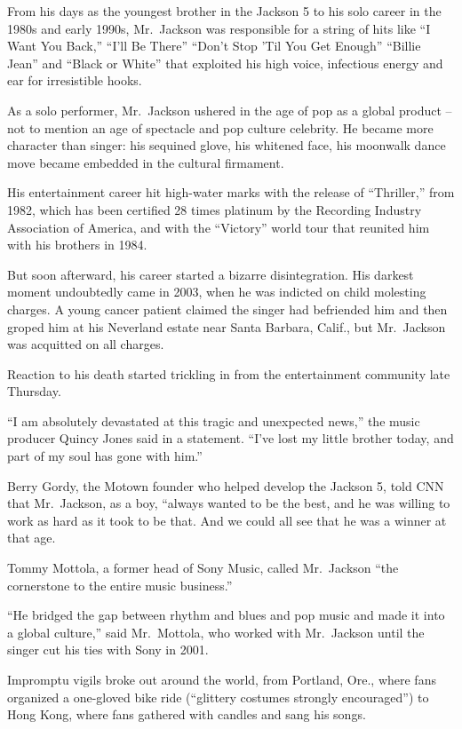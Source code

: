 ﻿\documentclass[12pt]{article}
\begin{document}
From his days as the youngest brother in the Jackson 5 to his solo career in the 1980s and early
1990s, Mr.~Jackson was responsible for a string of hits like ``I Want You Back,'' ``I'll Be There''
``Don't Stop 'Til You Get Enough'' ``Billie Jean'' and ``Black or White'' that exploited his high
voice, infectious energy and ear for irresistible hooks.

As a solo performer, Mr.~Jackson ushered in the age of pop as a global product -- not to mention an
age of spectacle and pop culture celebrity. He became more character than singer: his sequined
glove, his whitened face, his moonwalk dance move became embedded in the cultural firmament.

His entertainment career hit high-water marks with the release of ``Thriller,'' from 1982, which has
been certified 28 times platinum by the Recording Industry Association of America, and with the
``Victory'' world tour that reunited him with his brothers in 1984.

But soon afterward, his career started a bizarre disintegration. His darkest moment undoubtedly came
in 2003, when he was indicted on child molesting charges. A young cancer patient claimed the singer
had befriended him and then groped him at his Neverland estate near Santa Barbara, Calif., but
Mr.~Jackson was acquitted on all charges.

Reaction to his death started trickling in from the entertainment community late Thursday.

``I am absolutely devastated at this tragic and unexpected news,'' the music producer Quincy Jones
said in a statement. ``I've lost my little brother today, and part of my soul has gone with him.''

Berry Gordy, the Motown founder who helped develop the Jackson 5, told CNN that Mr.~Jackson, as a
boy, ``always wanted to be the best, and he was willing to work as hard as it took to be that. And
we could all see that he was a winner at that age.

Tommy Mottola, a former head of Sony Music, called Mr.~Jackson ``the cornerstone to the entire music
business.''

``He bridged the gap between rhythm and blues and pop music and made it into a global culture,''
said Mr.~Mottola, who worked with Mr.~Jackson until the singer cut his ties with Sony in 2001.

Impromptu vigils broke out around the world, from Portland, Ore., where fans organized a one-gloved
bike ride (``glittery costumes strongly encouraged'') to Hong Kong, where fans gathered with candles
and sang his songs.
\end{document}
